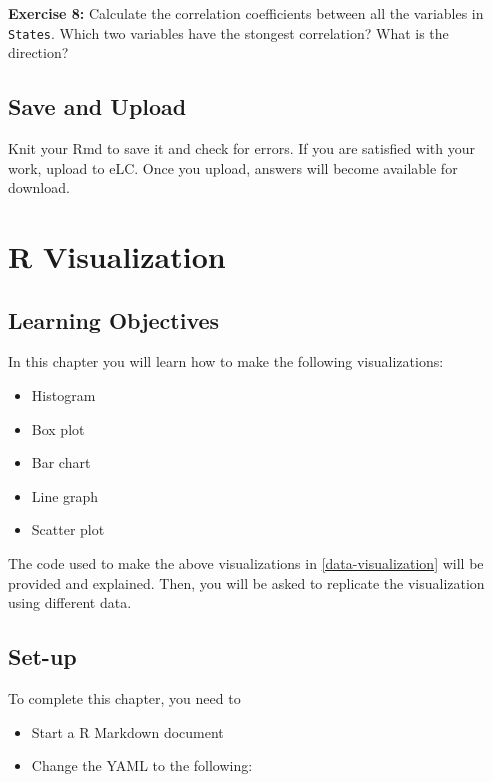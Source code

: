 \documentclass[
]{book}
\providecommand{\tightlist}{%
  \setlength{\itemsep}{0pt}\setlength{\parskip}{0pt}}
\newenvironment{rmdblock}[1]
  {\begin{shaded*}
  }
  {\end{shaded*}
  }
\newenvironment{learncheck}
  {\begin{rmdblock}{warning}}
  {\end{rmdblock}}
\begin{document}
\begin{learncheck}
\textbf{Exercise 8:} Calculate the correlation coefficients between all
the variables in \texttt{States}. Which two variables have the stongest
correlation? What is the direction?
\end{learncheck}

\hypertarget{save-and-upload}{%
\section{Save and Upload}\label{save-and-upload}}

Knit your Rmd to save it and check for errors. If you are satisfied with your work, upload to eLC. Once you upload, answers will become available for download.

\hypertarget{r-visualization}{%
\chapter{R Visualization}\label{r-visualization}}

\hypertarget{learning-objectives}{%
\section{Learning Objectives}\label{learning-objectives}}

In this chapter you will learn how to make the following visualizations:

\begin{itemize}
\tightlist
\item
  Histogram
\item
  Box plot
\item
  Bar chart
\item
  Line graph
\item
  Scatter plot
\end{itemize}

The code used to make the above visualizations in \ref{data-visualization} will be provided and explained. Then, you will be asked to replicate the visualization using different data.

\hypertarget{set-up}{%
\section{Set-up}\label{set-up}}

To complete this chapter, you need to

\begin{itemize}
\tightlist
\item
  Start a R Markdown document
\item
  Change the YAML to the following:
\end{itemize}
\end{document}
